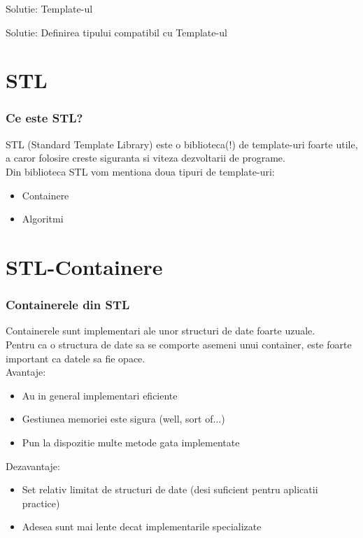 \documentclass{beamer}
\begin{document}
  \begin{frame}{Solutie: Template-ul}
  
  \end{frame}

  \begin{frame}{Solutie: Definirea tipului compatibil cu Template-ul}
  
  \end{frame}

\section{STL}

  \frame{\tableofcontents[currentsection]}

  \begin{frame}
  \frametitle{Ce este STL?}
  STL (Standard Template Library) este o biblioteca(!) de template-uri foarte utile, a caror folosire creste siguranta si viteza dezvoltarii de programe.
  \pause \\Din biblioteca STL vom mentiona doua tipuri de template-uri:
  \pause 
  \begin{itemize}
  \item Containere
  \item Algoritmi
  \end{itemize}
  \end{frame}

\section{STL-Containere}

  \frame{\tableofcontents[currentsection]}

  \begin{frame}
  \frametitle{Containerele din STL}
  Containerele sunt implementari ale unor structuri de date foarte uzuale.
  \\ \pause Pentru ca o structura de date sa se comporte asemeni unui container, este foarte important ca datele sa fie opace.
  \\ \pause Avantaje:
  \begin{itemize}
  \pause \item Au in general implementari eficiente
  \pause \item Gestiunea memoriei este sigura \pause (well, sort of...)
  \pause \item Pun la dispozitie multe metode gata implementate
  \end{itemize}
  \pause
  Dezavantaje:
  \pause
  \begin{itemize}
  \item Set relativ limitat de structuri de date (desi suficient pentru aplicatii practice)
  \item Adesea sunt mai lente decat implementarile specializate 
  \end{itemize}
  \end{frame}	
\end{document}
